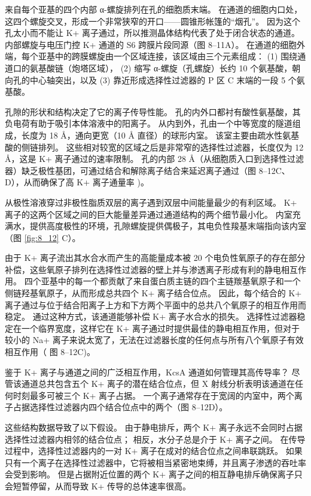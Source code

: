 来自每个亚基的四个内部 α-螺旋排列在孔的细胞质末端。 
在通道的细胞内口处，这四个螺旋交叉，形成一个非常狭窄的开口——圆锥形帐篷的“烟孔”。 
因为这个孔太小而不能让 K+ 离子通过，所以推测晶体结构代表了处于闭合状态的通道。 
内部螺旋与电压门控 K+ 通道的 S6 跨膜片段同源（图 8–11A）。 
在通道的细胞外端，每个亚基中的跨膜螺旋由一个区域连接，该区域由三个元素组成：
(1) 围绕通道口的氨基酸链（炮塔区域），
(2) 缩写 α-螺旋（孔螺旋）长约 10 个氨基酸，朝向孔的中心轴突出，以及
(3) 靠近形成选择性过滤器的 P 区 C 末端的一段 5 个氨基酸。


孔隙的形状和结构决定了它的离子传导性能。 
孔的内外口都衬有酸性氨基酸，其负电荷有助于吸引本体溶液中的阳离子。 
从内到外，孔由一个中等宽度的隧道组成，长度为 18 Å，通向更宽（10 Å 直径）的球形内室。 
该室主要由疏水性氨基酸的侧链排列。 
这些相对较宽的区域之后是非常窄的选择性过滤器，长度仅为 12 Å，这是 K+ 离子通过的速率限制。 
孔的内部 28 Å（从细胞质入口到选择性过滤器）缺乏极性基团，可通过结合和解除离子结合来延迟离子通过（图 8–12C、D），从而确保了高 K+ 离子通量率 )。


从极性溶液穿过非极性脂质双层的离子遇到双层中间能量最少的有利区域。 
K+ 离子的这两个区域之间的巨大能量差异通过通道结构的两个细节最小化。 
内室充满水，提供高度极性的环境，孔隙螺旋提供偶极子，其电负性羧基末端指向该内室（图 \ref{fig:8_12} C）。


由于 K+ 离子流出其水合水而产生的高能量成本被 20 个电负性氧原子的存在部分补偿，这些氧原子排列在选择性过滤器的壁上并与渗透离子形成有利的静电相互作用。 
四个亚基中的每一个都贡献了来自蛋白质主链的四个主链羰基氧原子和一个侧链羟基氧原子，从而形成总共四个 K+ 离子结合位点。 
因此，每个结合的 K+ 离子通过与位于结合阳离子上方和下方两个平面中的总共八个氧原子的相互作用而稳定。 
通过这种方式，该通道能够补偿 K+ 离子水合水的损失。 
选择性过滤器稳定在一个临界宽度，这样它在 K+ 离子通过时提供最佳的静电相互作用，但对于较小的 Na+ 离子来说太宽了，无法在过滤器长度的任何点与所有八个氧原子有效相互作用（ 图 8–12C)。


鉴于 K+ 离子与通道之间的广泛相互作用，KcsA 通道如何管理其高传导率？ 
尽管该通道总共包含五个 K+ 离子的潜在结合位点，但 X 射线分析表明该通道在任何时刻最多可被三个 K+ 离子占据。 
一个离子通常存在于宽阔的内室中，两个离子占据选择性过滤器内四个结合位点中的两个（图 8–12D）。


这些结构数据导致了以下假设。 
由于静电排斥，两个 K+ 离子永远不会同时占据选择性过滤器内相邻的结合位点； 
相反，水分子总是介于 K+ 离子之间。 
在传导过程中，选择性过滤器内的一对 K+ 离子在成对的结合位点之间串联跳跃。 
如果只有一个离子在选择性过滤器中，它将被相当紧密地束缚，并且离子渗透的吞吐率会受到影响。 
但是占据附近位置的两个 K+ 离子之间的相互静电排斥确保离子只会短暂停留，从而导致 K+ 传导的总体速率很高。


